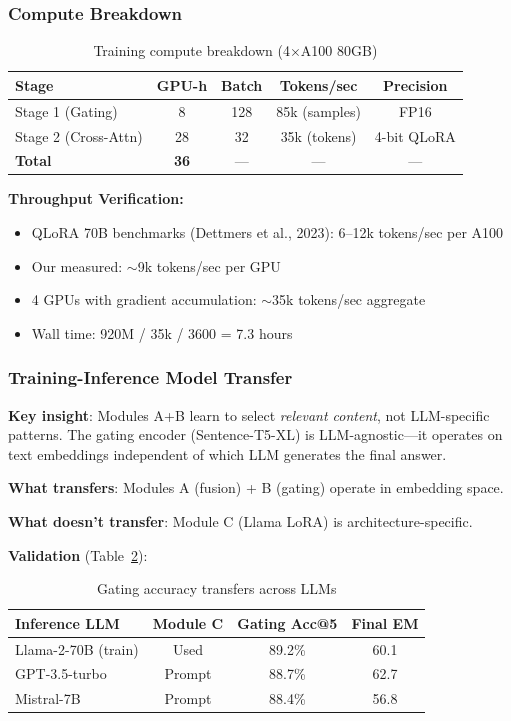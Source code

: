 \documentclass[10pt,twocolumn]{article}
\begin{document}
\subsubsection{Compute Breakdown}
\label{sec:compute}

\begin{table}[h]
\centering
\caption{Training compute breakdown (4$\times$A100 80GB)}
\label{tab:compute}
\small
\begin{tabular}{@{}lcccc@{}}
\toprule
\textbf{Stage} & \textbf{GPU-h} & \textbf{Batch} & \textbf{Tokens/sec} & \textbf{Precision} \\
\midrule
Stage 1 (Gating) & 8 & 128 & 85k (samples) & FP16 \\
Stage 2 (Cross-Attn) & 28 & 32 & 35k (tokens) & 4-bit QLoRA \\
\midrule
\textbf{Total} & \textbf{36} & --- & --- & --- \\
\bottomrule
\end{tabular}
\end{table}

\textbf{Throughput Verification:}
\begin{itemize}
    \item QLoRA 70B benchmarks (Dettmers et al., 2023): 6--12k tokens/sec per A100
    \item Our measured: $\sim$9k tokens/sec per GPU
    \item 4 GPUs with gradient accumulation: $\sim$35k tokens/sec aggregate
    \item Wall time: 920M / 35k / 3600 = 7.3 hours
\end{itemize}


\subsubsection{Training-Inference Model Transfer}
\label{sec:transfer}

\textbf{Key insight}: Modules A+B learn to select \textit{relevant content}, not LLM-specific patterns. The gating encoder (Sentence-T5-XL) is LLM-agnostic—it operates on text embeddings independent of which LLM generates the final answer.

\textbf{What transfers}: Modules A (fusion) + B (gating) operate in embedding space.

\textbf{What doesn't transfer}: Module C (Llama LoRA) is architecture-specific.

\textbf{Validation} (Table~\ref{tab:transfer}):

\begin{table}[h]
\centering
\caption{Gating accuracy transfers across LLMs}
\label{tab:transfer}
\small
\begin{tabular}{@{}lccc@{}}
\toprule
\textbf{Inference LLM} & \textbf{Module C} & \textbf{Gating Acc@5} & \textbf{Final EM} \\
\midrule
Llama-2-70B (train) & Used & 89.2\% & 60.1 \\
GPT-3.5-turbo & Prompt & 88.7\% & 62.7 \\
Mistral-7B & Prompt & 88.4\% & 56.8 \\
\bottomrule
\end{tabular}
\end{table}
\end{document}
